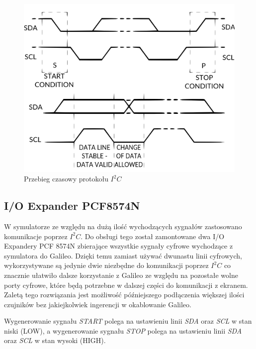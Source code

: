 \documentclass{xmgr}
\begin{document}
\begin{figure}[!h]
    \centering
    \includegraphics[height=0.3\textheight]{images/i2c.png}
    \caption{Przebieg czasowy protokołu $I^2C$}
\end{figure}

\subsection{I/O Expander PCF8574N}
W symulatorze ze względu na dużą ilość wychodzących sygnałów zastosowano komunikacje poprzez $I^2C$. Do obsługi tego został zamontowane dwa I/O Expandery PCF 8574N zbierające wszystkie sygnały cyfrowe wychodzące z symulatora do Galileo. Dzięki temu zamiast używać dwunastu linii cyfrowych, wykorzystywane są jedynie dwie niezbędne do komunikacji poprzez $I^2C$ co znacznie ułatwiło dalsze korzystanie z Galileo ze względu na pozostałe wolne porty cyfrowe, które będą potrzebne w dalszej części do komunikacji z ekranem. Zaletą tego rozwiązania jest możliwość późniejszego podłączenia większej ilości czujników bez jakiejkolwiek ingerencji w okablowanie Galileo.

Wygenerowanie sygnału \emph{START} polega na ustawieniu linii \emph{SDA} oraz \emph{SCL} w stan niski (LOW), a wygenerowanie sygnału \emph{STOP} polega na ustawieniu linii \emph{SDA} oraz \emph{SCL} w stan wysoki (HIGH).
\end{document}
